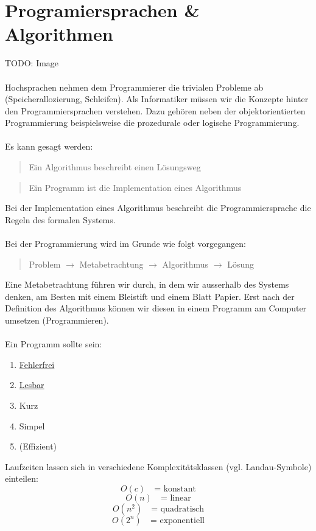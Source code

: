 \documentclass{report}
\begin{document}
\section{Programiersprachen \& Algorithmen}
TODO: Image\\\\
Hochsprachen nehmen dem Programmierer die trivialen Probleme ab (Speicherallozierung, Schleifen). Als Informatiker müssen wir die Konzepte hinter den Programmiersprachen verstehen. Dazu gehören neben der objektorientierten Programmierung beispielsweise die prozedurale oder logische Programmierung.\\\\
Es kann gesagt werden:
\begin{quote}Ein Algorithmus beschreibt einen Lösungsweg\end{quote}
\begin{quote}Ein Programm ist die Implementation eines Algorithmus\end{quote}
Bei der Implementation eines Algorithmus beschreibt die Programmiersprache die Regeln des formalen Systems.\\\\
Bei  der Programmierung wird im Grunde wie folgt vorgegangen:
\begin{quote}Problem $\to$ Metabetrachtung $\to$ Algorithmus $\to$ Lösung\end{quote}
Eine Metabetrachtung führen wir durch, in dem wir ausserhalb des Systems denken, am Besten mit einem Bleistift und einem Blatt Papier. Erst nach der Definition des Algorithmus können wir diesen in einem Programm am Computer umsetzen (Programmieren).\\\\
Ein Programm sollte sein:\begin{enumerate} 
\item \underline{Fehlerfrei}
\item \underline{Lesbar}
\item Kurz
\item Simpel
\item (Effizient)
\end{enumerate}
Laufzeiten lassen sich in verschiedene Komplexitätsklassen (vgl. Landau-Symbole) einteilen:
\begin{equation}O(c) \quad\mbox{= konstant}\end{equation}
\begin{equation}O(n) \quad\mbox{= linear}\end{equation}
\begin{equation}O(n^2) \quad\mbox{= quadratisch}\end{equation}
\begin{equation}O(2^n) \quad\mbox{= exponentiell}\end{equation}
\newpage
\end{document}
